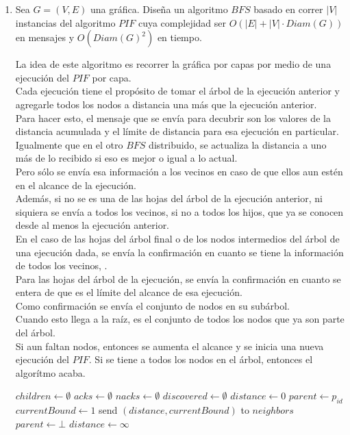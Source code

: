 \documentclass[12pt,a4paper]{report}
\begin{document}
	\begin{enumerate}
		\item {
			Sea $G = (V, E)$ una gráfica. Diseña un algoritmo $BFS$ basado en correr
			$|V|$ instancias del algoritmo $PIF$ cuya complejidad ser
			$O(|E|+|V|\cdot Diam(G))$ en mensajes y $O(Diam(G)^2)$ en tiempo.

			La idea de este algoritmo es recorrer la gráfica por capas por medio de
			una ejecución del $PIF$ por capa.\\
			Cada ejecución tiene el propósito de tomar el árbol de la ejecución
			anterior y agregarle todos los nodos a distancia una más que la ejecución
			anterior.\\
			Para hacer esto, el mensaje que se envía para decubrir son los valores de
			la distancia acumulada y el límite de distancia para esa ejecución en
			particular.\\
			Igualmente que en el otro $BFS$ distribuido, se actualiza la distancia a
			uno más de lo recibido si eso es mejor o igual a lo actual.\\
			Pero sólo se envía esa información a los vecinos en caso de que ellos
			aun estén en el alcance de la ejecución.\\
			Además, si no se es una de las hojas del árbol de la ejecución anterior,
			ni siquiera se envía a todos los vecinos, si no a todos los hijos, que ya
			se conocen desde al menos la ejecución anterior.\\
			En el caso de las hojas del árbol final o de los nodos intermedios del
			árbol de una ejecución dada, se envía la confirmación en cuanto se tiene
			la información de todos los vecinos, .\\
			Para las hojas del árbol de la ejecución, se envía la confirmación en
			cuanto se entera de que es el límite del alcance de esa ejecución.\\
			Como confirmación se envía el conjunto de nodos en su subárbol.\\
			Cuando esto llega a la raíz, es el conjunto de todos los nodos que ya son parte
			del árbol.\\
			Si aun faltan nodos, entonces se aumenta el alcance y se inicia
			una nueva ejecución del $PIF$.
			Si se tiene a todos los nodos en el árbol, entonces el algorítmo acaba.

			\begin{algorithmic}[1]
				\Initially
					\State $children \gets \emptyset$
					\State $acks \gets \emptyset$
					\State $nacks \gets \emptyset$
					\State $discovered \gets \emptyset$
						\State $distance \gets 0$
						\State $parent \gets p_{id}$
						\State $currentBound \gets 1$
						\State send $(distance, currentBound)$ to $neighbors$
					\Else
						\State $parent \gets \bot$
						\State $distance \gets \infty$
					\EndIf
				\EndInitially
				\Statex


\end{algorithmic}}
\end{enumerate}
\end{document}
